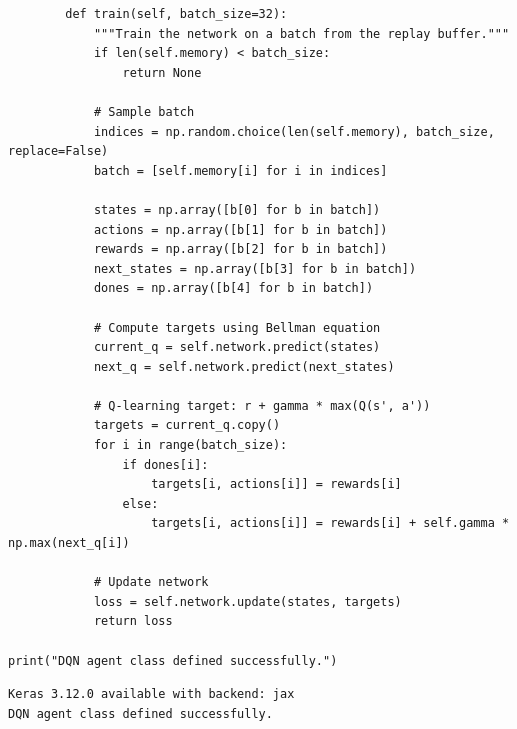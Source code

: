 \begin{verbatim}
        def train(self, batch_size=32):
            """Train the network on a batch from the replay buffer."""
            if len(self.memory) < batch_size:
                return None
            
            # Sample batch
            indices = np.random.choice(len(self.memory), batch_size, replace=False)
            batch = [self.memory[i] for i in indices]
            
            states = np.array([b[0] for b in batch])
            actions = np.array([b[1] for b in batch])
            rewards = np.array([b[2] for b in batch])
            next_states = np.array([b[3] for b in batch])
            dones = np.array([b[4] for b in batch])
            
            # Compute targets using Bellman equation
            current_q = self.network.predict(states)
            next_q = self.network.predict(next_states)
            
            # Q-learning target: r + gamma * max(Q(s', a'))
            targets = current_q.copy()
            for i in range(batch_size):
                if dones[i]:
                    targets[i, actions[i]] = rewards[i]
                else:
                    targets[i, actions[i]] = rewards[i] + self.gamma * np.max(next_q[i])
            
            # Update network
            loss = self.network.update(states, targets)
            return loss
    
print("DQN agent class defined successfully.")
\end{verbatim}

\begin{verbatim}
Keras 3.12.0 available with backend: jax
DQN agent class defined successfully.
\end{verbatim}

